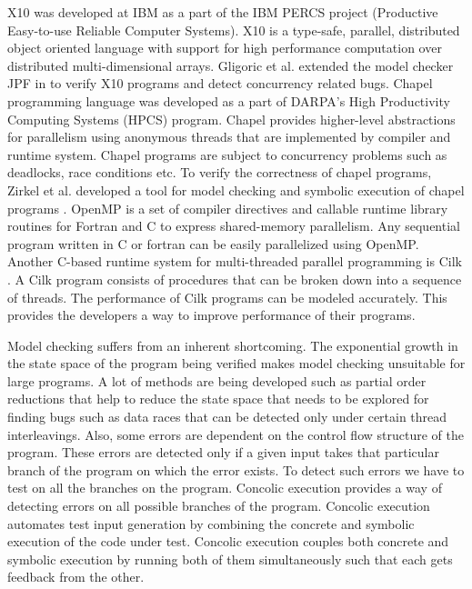 X10 \cite{charles2005x10} was developed at IBM as a part of the IBM PERCS project (Productive Easy-to-use Reliable Computer Systems). X10 is a type-safe, parallel, distributed object oriented language with support for high performance computation over distributed multi-dimensional arrays. Gligoric et al. extended the model checker JPF in \cite{gligoric2012x10x} to verify X10 programs and detect concurrency related bugs. Chapel programming language \cite{chamberlain2007parallel} was developed as a part of DARPA's High Productivity Computing Systems (HPCS) program. Chapel provides higher-level abstractions for parallelism using anonymous threads that are implemented by compiler and runtime system. Chapel programs are subject to concurrency problems such as deadlocks, race conditions etc. To verify the correctness of chapel programs, Zirkel et al. developed a tool for model checking and symbolic execution of chapel programs \cite{zirkel2013automated}. OpenMP \cite{dagum1998openmp} is a set of compiler directives and callable runtime library routines for Fortran and C to express shared-memory parallelism. Any sequential program written in C or fortran can be easily parallelized using OpenMP. Another C-based runtime system for multi-threaded parallel programming is Cilk \cite{blumofe1996cilk} . A Cilk program consists of procedures that can be broken down into a sequence of threads. The performance of Cilk programs can be modeled accurately. This provides the developers a way to improve performance of their programs.

Model checking suffers from an inherent shortcoming. The exponential growth in the state space of the program being verified makes model checking unsuitable for large programs. A lot of methods are being developed such as partial order reductions that help to reduce the state space that needs to be explored for finding bugs such as data races that can be detected only under certain thread interleavings. Also, some errors are dependent on the control flow structure of the program. These errors are detected only if a given input takes that particular branch of the program on which the error exists. To detect such errors we have to test on all the branches on the program. Concolic execution provides a way of detecting errors on all possible branches of the program. Concolic execution automates test input generation by combining the concrete and symbolic execution of the code under test. Concolic execution couples both concrete and symbolic execution by running both of them simultaneously such that each gets feedback from the other.

